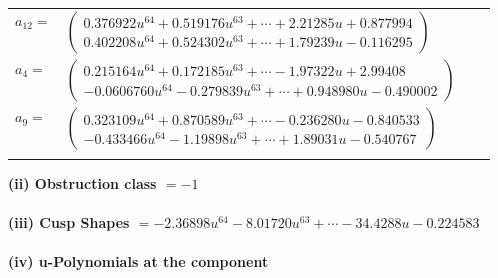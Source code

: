 \documentclass[1p]{elsarticle_modified}
\theoremstyle{definition}
\begin{document}
\begin{tabular}{m{7pt} m{180pt} m{7pt} m{180pt} }
\flushright $a_{12}=$&$\begin{pmatrix}0.376922 u^{64}+0.519176 u^{63}+\cdots+2.21285 u+0.877994\\0.402208 u^{64}+0.524302 u^{63}+\cdots+1.79239 u-0.116295\end{pmatrix}$ \\
\flushright $a_{4}=$&$\begin{pmatrix}0.215164 u^{64}+0.172185 u^{63}+\cdots-1.97322 u+2.99408\\-0.0606760 u^{64}-0.279839 u^{63}+\cdots+0.948980 u-0.490002\end{pmatrix}$ \\
\flushright $a_{9}=$&$\begin{pmatrix}0.323109 u^{64}+0.870589 u^{63}+\cdots-0.236280 u-0.840533\\-0.433466 u^{64}-1.19898 u^{63}+\cdots+1.89031 u-0.540767\end{pmatrix}$\\&\end{tabular}
\flushleft \textbf{(ii) Obstruction class $= -1$}\\~\\
\flushleft \textbf{(iii) Cusp Shapes $= -2.36898 u^{64}-8.01720 u^{63}+\cdots-34.4288 u-0.224583$}\\~\\
\newpage\renewcommand{\arraystretch}{1}
\flushleft \textbf{(iv) u-Polynomials at the component}\newline \\
\end{document}
